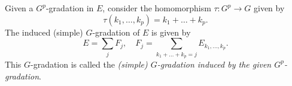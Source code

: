 Given a $G^p$-gradation in $E$, consider the homomorphism $\tau: G^p \rightarrow G$ given by
$$\tau(k_1, \dots, k_p) = k_1 + \dots + k_p.$$
The induced (simple) $G$-gradation of $E$ is given by
$$E = \sum_{j} F_j, \quad F_j = \sum_{k_1 + \dots + k_p = j} E_{k_1, \dots, k_p}.$$
This $G$-gradation is called the \textit{(simple) $G$-gradation induced by the given $G^p$-gradation}.
